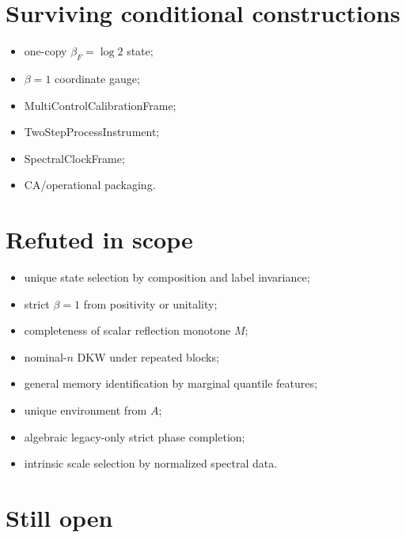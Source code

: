 \documentclass[11pt,a4paper,openany]{report}
\begin{document}
\section{Surviving conditional constructions}

\begin{itemize}
\item 
one-copy \(\beta_F=\log2\) state;

\item 
\(\beta=1\) coordinate gauge;

\item 
MultiControlCalibrationFrame;

\item 
TwoStepProcessInstrument;

\item 
SpectralClockFrame;

\item 
CA/\allowbreak{}operational packaging.

\end{itemize}

\section{Refuted in scope}

\begin{itemize}
\item 
unique state selection by composition and label invariance;

\item 
strict \(\beta=1\) from positivity or unitality;

\item 
completeness of scalar reflection monotone \(M\);

\item 
nominal-\(n\) DKW under repeated blocks;

\item 
general memory identification by marginal quantile features;

\item 
unique environment from \(A\);

\item 
algebraic legacy-only strict phase completion;

\item 
intrinsic scale selection by normalized spectral data.

\end{itemize}

\section{Still open}
\end{document}
